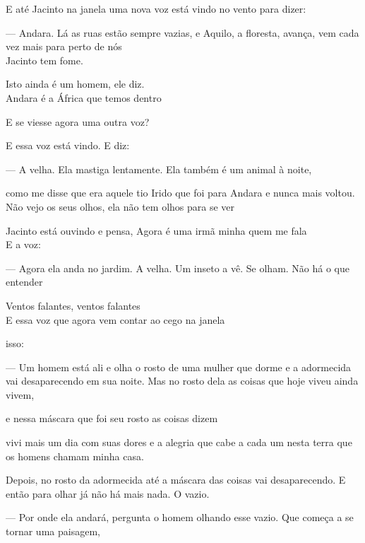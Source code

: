 E até Jacinto na janela uma nova voz está vindo no vento para dizer:

--- Andara. Lá as ruas estão sempre vazias, e Aquilo, a floresta, avança,
vem cada vez mais para perto de nós\\

Jacinto tem fome.

Isto ainda é um homem, ele diz.\\

Andara é a África que temos dentro

\pagebreak

\vspace*{4cm}

E se viesse agora uma outra voz?

E essa voz está vindo. E diz:

--- A velha. Ela mastiga lentamente. Ela também é um animal à noite,

como me disse que era aquele tio Irido que foi para Andara e nunca mais
voltou. Não vejo os seus olhos, ela não tem olhos para se ver

Jacinto está ouvindo e pensa, Agora é uma irmã minha quem me fala\\

E a voz:

--- Agora ela anda no jardim. A velha. Um inseto a vê. Se olham. Não há o
que entender

\pagebreak

\vspace*{4cm}

Ventos falantes, ventos falantes\\

E essa voz que agora vem contar ao cego na janela

isso:

--- Um homem está ali e olha o rosto de uma mulher que dorme e a
adormecida vai desaparecendo em sua noite. Mas no rosto dela as coisas
que hoje viveu ainda vivem,

e nessa máscara que foi seu rosto as coisas dizem

vivi mais um dia com suas dores e a alegria que cabe a cada um nesta
terra que os homens chamam minha casa.

Depois, no rosto da adormecida até a máscara das coisas vai
desaparecendo. E então para olhar já não há mais nada. O vazio.

--- Por onde ela andará, pergunta o homem olhando esse vazio. Que começa a
se tornar uma paisagem,

